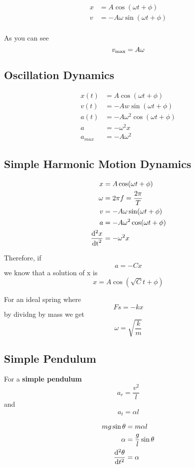 \documentclass[12pt]{article}
\begin{document}
\begin{align*}
x &= A\cos(\omega t + \phi)\\
v &= -A\omega\sin(\omega t + \phi)\\
\end{align*}

As you can see \[ v_{{\rm max}} = A\omega \] 

\subsection*{Oscillation Dynamics}
\begin{align*}
x(t) &= A\cos(\omega t+\phi)\\
v(t) &= -Aw\sin(\omega t+\phi)\\
a(t) &= -A\omega^2\cos(\omega t+\phi)\\
a &= -\omega^2x\\
a_{max} &= -A\omega^2
\end{align*}

\subsection*{Simple Harmonic Motion Dynamics}
\begin{align*}
x &= A\cos(\omega t + \phi)\\
\omega &= 2\pi f = \frac{2\pi}{T}\\
v &= -A\omega\sin(\omega t + \phi)\\
a &= -A\omega^2\cos(\omega t + \phi)\\
\frac{{\rm d}^2x}{{\rm dt}^2} &= -\omega^2x
\end{align*}

Therefore, if \[ a = -Cx \] we know that a solution of x is \[ x = A\cos(\sqrt{C}t + \phi) \]

For an ideal spring where \[ Fs = -kx \] by dividng by mass we get \[ \omega = \sqrt{\frac{k}{m}} \]

\subsection*{Simple Pendulum}
For a {\bf simple pendulum} \[ a_r = \frac{v^2}{l} \] and \[ a_t = \alpha l \]

\begin{align*}
mg\sin\theta &= m\alpha l\\
\alpha &= \frac{g}{l}\sin\theta\\
\frac{{\rm d}^2\theta}{{\rm d}t^2} &= \alpha
\end{align*}
\end{document}
